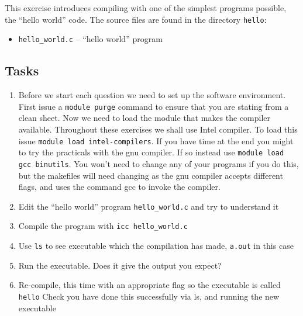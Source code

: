 \documentclass[a4paper, 12pt]{article}
\def \cc   {\tt }               %
\begin{document}
This exercise introduces compiling with
one of the simplest programs possible, the ``hello world'' code.  The source
files are found in the directory {\cc hello}:
%
\begin{itemize}
  \item {\cc hello\_world.c} -- ``hello world'' program 
\end{itemize}
%

\subsection*{Tasks}

\begin{enumerate}

  \item Before we start each question we need to set up the software 
    environment. First issue a {\cc module purge} command to ensure
    that you are stating from a clean sheet. Now we need to load
    the module that makes the compiler available.
    Throughout these exercises we shall use Intel compiler. To load this issue 
    {\cc module load intel-compilers}. If you have time at the end
    you might to try the practicals with the gnu
    compiler. If so instead use {\cc module load gcc binutils}.
    You won't need to change any of your programs if you do this, but the
    makefiles will need changing as the gnu compiler accepts different flags, and uses
    the command gcc to invoke the compiler.

  \item Edit the ``hello world'' program {\cc hello\_world.c} and try to understand it

  \item Compile the program with {\cc icc hello\_world.c}

  \item Use \texttt{ls} to see executable which the compilation has made, {\cc a.out} in this case

  \item Run the executable. Does it give the output you expect?

  \item Re-compile, this time with an appropriate flag so the executable is called {\cc hello}
    Check you have done this successfully via ls, and running the new executable

\end{enumerate}


\end{document}
